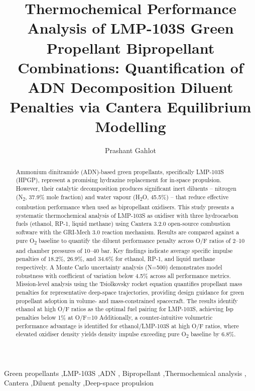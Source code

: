 \documentclass[review]{elsarticle}
\begin{document}
\begin{frontmatter}

\title{Thermochemical Performance Analysis of LMP-103S 
Green Propellant Bipropellant Combinations: 
Quantification of ADN Decomposition Diluent Penalties 
via Cantera Equilibrium Modelling}

\author[bologna]{Prashant Gahlot}
\address[bologna]{Department of Industrial Engineering (DIN), 
Alma Mater Studiorum -- University of Bologna, 
Forl\`{i}, Italy}

\begin{abstract}
Ammonium dinitramide (ADN)-based green propellants, 
specifically LMP-103S (HPGP), represent a promising 
hydrazine replacement for in-space propulsion. 
However, their catalytic decomposition produces significant 
inert diluents -- nitrogen (N\textsubscript{2}, 37.9\% 
mole fraction) and water vapour (H\textsubscript{2}O, 
45.5\%) -- that reduce effective combustion performance 
when used as bipropellant oxidisers. 
This study presents a systematic thermochemical analysis 
of LMP-103S as oxidiser with three hydrocarbon fuels 
(ethanol, RP-1, liquid methane) using Cantera 3.2.0 
open-source combustion software with the GRI-Mech 3.0 
reaction mechanism. 
Results are compared against a pure O\textsubscript{2} 
baseline to quantify the diluent performance penalty 
across O/F ratios of 2--10 and chamber pressures of 
10--40 bar. 
Key findings indicate average specific impulse penalties 
of 18.2\%, 26.9\%, and 34.6\% for ethanol, RP-1, and 
liquid methane respectively. 
A Monte Carlo uncertainty analysis (N=500) demonstrates 
model robustness with coefficient of variation below 
4.5\% across all performance metrics. 
Mission-level analysis using the Tsiolkovsky rocket equation 
quantifies propellant mass penalties for representative 
deep-space trajectories, providing design guidance for 
green propellant adoption in volume- and mass-constrained 
spacecraft. 
The results identify ethanol at high O/F ratios as the 
optimal fuel pairing for LMP-103S, achieving Isp penalties 
below 1\% at O/F=10 Additionally, a counter-intuitive volumetric performance advantage 
is identified for ethanol/LMP-103S at high O/F ratios, where 
elevated oxidiser density yields density impulse exceeding 
pure O\textsubscript{2} baseline by 6.8\%.
\end{abstract}

\begin{keyword}
Green propellants \sep LMP-103S \sep ADN \sep 
Bipropellant \sep Thermochemical analysis \sep 
Cantera \sep Diluent penalty \sep Deep-space propulsion
\end{keyword}

\end{frontmatter}
\end{document}
